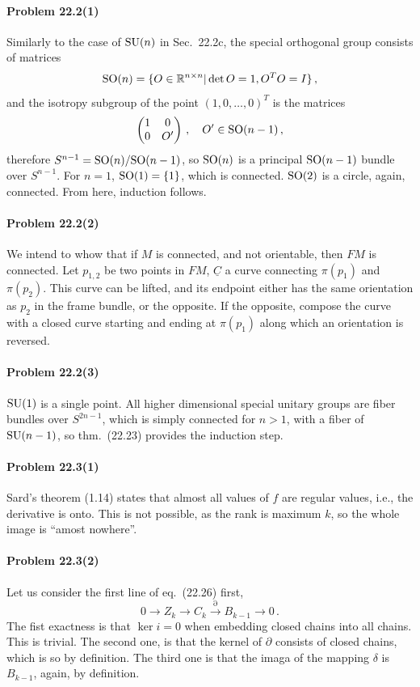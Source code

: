 \documentclass[a4paper,12pt]{article}
\newcommand{\problem}[1]{\paragraph{Problem #1}}
\begin{document}

\problem{22.2(1)} Similarly to the case of ${\rm SU}(n)$ in Sec.\ 22.2c, the special orthogonal group consists of matrices
\[
 {\rm SO}(n) = \{ O \in \mathbb{R}^{n\times n} | \det O=1, O^T O=I\}\,,
\]
and the isotropy subgroup of the point $(1,0, \dots, 0)^T$ is the matrices
\[
 \begin{pmatrix} 1 & 0 \\ 0 & O' \end{pmatrix}\,,\quad O'\in {\rm SO}(n-1)\,,
\]
therefore $S^{n-1} = {\rm SO}(n)/{\rm SO}(n-1)$, so ${\rm SO}(n)$ is a principal ${\rm SO}(n-1)$ bundle over $S^{n-1}$. For $n=1$, ${\rm SO}(1) = \{1\}$, which is connected. ${\rm SO}(2)$ is a circle, again, connected. From here, induction follows.


\problem{22.2(2)} We intend to whow that if $M$ is connected, and not orientable, then $FM$ is connected. Let $p_{1,2}$ be two points in $FM$, $\underline{C}$ a curve connecting $\pi(p_1)$ and $\pi(p_2)$. This curve can be lifted, and its endpoint either has the same orientation as $p_2$ in the frame bundle, or the opposite. If the opposite, compose the curve with a closed curve starting and ending at $\pi(p_1)$ along which an orientation is reversed.


\problem{22.2(3)} ${\rm SU}(1)$ is a single point. All higher dimensional special unitary groups are fiber bundles over $S^{2n-1}$, which is simply connected for $n>1$, with a fiber of ${\rm SU}(n-1)$, so thm.\ (22.23) provides the induction step.


\problem{22.3(1)} Sard's theorem (1.14) states that almost all values of $f$ are regular values, i.e., the derivative is onto.  This is not possible, as the rank is maximum $k$, so the whole image is ``amost nowhere''.


\problem{22.3(2)} Let us consider the first line of eq.\ (22.26) first,
\[
 0 \to Z_k \to C_k \overset{\partial}{\to} B_{k-1} \to 0\,.
\]
The fist exactness is that $\ker i=0$ when embedding closed chains into all chains. This is trivial. The second one, is that the kernel of $\partial$ consists of closed chains, which is so by definition. The third one is that the imaga of the mapping $\delta$ is $B_{k-1}$, again, by definition.
\end{document}
